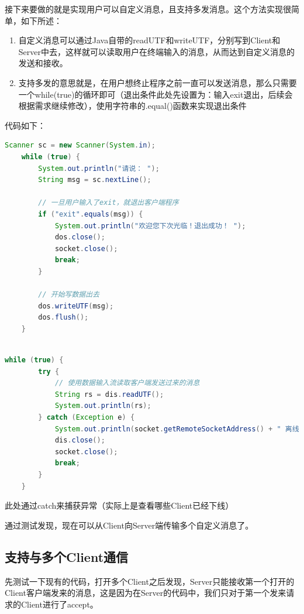 \documentclass{article}
\begin{document}
	接下来要做的就是实现用户可以自定义消息，且支持多发消息。这个方法实现很简单，如下所述：
	
	\begin{enumerate}[noitemsep, label={{\arabic*})}]
		\item 自定义消息可以通过Java自带的readUTF和writeUTF，分别写到Client和Server中去，这样就可以读取用户在终端输入的消息，从而达到自定义消息的发送和接收。
		\item 支持多发的意思就是，在用户想终止程序之前一直可以发送消息，那么只需要一个while(true)的循环即可（退出条件此处先设置为：输入exit退出，后续会根据需求继续修改），使用字符串的.equal()函数来实现退出条件
	\end{enumerate}\textbf{}
	
	代码如下：
	
	\begin{lstlisting}[language=Java, title=修改的Client部分, tabsize=4]
	Scanner sc = new Scanner(System.in);
	while (true) {
		System.out.println("请说： ");
		String msg = sc.nextLine();
		
		// 一旦用户输入了exit，就退出客户端程序
		if ("exit".equals(msg)) {
			System.out.println("欢迎您下次光临！退出成功！ ");
			dos.close();
			socket.close();
			break;
		}
		
		// 开始写数据出去
		dos.writeUTF(msg);
		dos.flush();
	}
	
	\end{lstlisting}
	
	\begin{lstlisting}[language=Java, title=修改的Server部分, tabsize=4]
	while (true) {
		try {
			// 使用数据输入流读取客户端发送过来的消息
			String rs = dis.readUTF();
			System.out.println(rs);
		} catch (Exception e) {  
			System.out.println(socket.getRemoteSocketAddress() + " 离线了！");
			dis.close();
			socket.close();
			break;
		}
	}
	\end{lstlisting}
	
	此处通过catch来捕获异常（实际上是查看哪些Client已经下线）
	
	通过测试发现，现在可以从Client向Server端传输多个自定义消息了。
	
	\subsection{支持与多个Client通信}
	
	先测试一下现有的代码，打开多个Client之后发现，Server只能接收第一个打开的Client客户端发来的消息，这是因为在Server的代码中，我们只对于第一个发来请求的Client进行了accept。
	
\end{document}
